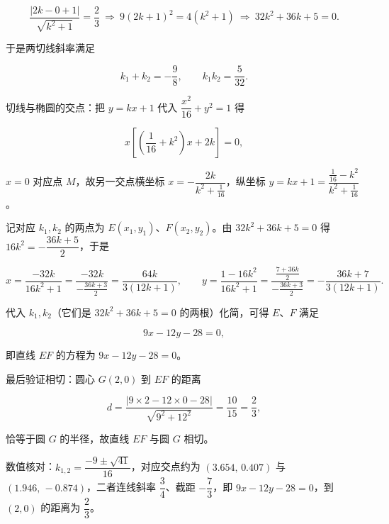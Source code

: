\begin{answer}
\nopagebreak[4]
\[\frac{|2k-0+1|}{\sqrt{k^2+1}}=\frac23\ \Longrightarrow\ 9(2k+1)^2=4(k^2+1)\ \Longrightarrow\ 32k^2+36k+5=0.\]

于是两切线斜率满足

\nopagebreak[4]
\[k_1+k_2=-\frac98,\qquad k_1k_2=\frac{5}{32}.\]

切线与椭圆的交点：把 $y=kx+1$ 代入 $\dfrac{x^2}{16}+y^2=1$ 得

\nopagebreak[4]
\[x\left[\left(\frac1{16}+k^2\right)x+2k\right]=0,\]

$x=0$ 对应点 $M$，故另一交点横坐标 $x=-\dfrac{2k}{k^2+\frac1{16}}$，纵坐标 $y=kx+1=\dfrac{\frac1{16}-k^2}{k^2+\frac1{16}}$。

记对应 $k_1,k_2$ 的两点为 $E(x_1,y_1)$、$F(x_2,y_2)$。由 $32k^2+36k+5=0$ 得 $16k^2=-\dfrac{36k+5}{2}$，于是

\nopagebreak[4]
\[x=\frac{-32k}{16k^2+1}=\frac{-32k}{-\frac{36k+3}{2}}=\frac{64k}{3(12k+1)},\qquad y=\frac{1-16k^2}{16k^2+1}=\frac{\frac{7+36k}{2}}{-\frac{36k+3}{2}}=-\frac{36k+7}{3(12k+1)}.\]

代入 $k_1,k_2$（它们是 $32k^2+36k+5=0$ 的两根）化简，可得 $E$、$F$ 满足

\nopagebreak[4]
\[9x-12y-28=0,\]

即直线 $EF$ 的方程为 $9x-12y-28=0$。

最后验证相切：圆心 $G(2,0)$ 到 $EF$ 的距离

\nopagebreak[4]
\[d=\frac{|9\times2-12\times0-28|}{\sqrt{9^2+12^2}}=\frac{10}{15}=\frac23,\]

恰等于圆 $G$ 的半径，故直线 $EF$ 与圆 $G$ 相切。

数值核对：$k_{1,2}=\dfrac{-9\pm\sqrt{41}}{16}$，对应交点约为 $(3.654,\,0.407)$ 与 $(1.946,\,-0.874)$，二者连线斜率 $\dfrac34$、截距 $-\dfrac73$，即 $9x-12y-28=0$，到 $(2,0)$ 的距离为 $\dfrac23$。


\end{answer}